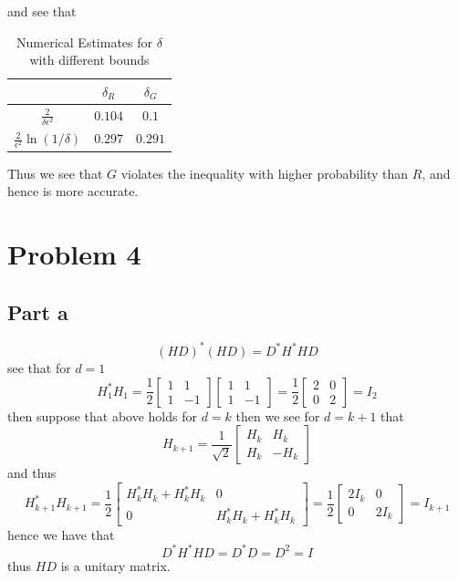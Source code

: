 \documentclass[12pt]{report}
\begin{document}
and see that

\begin{table}[H]
    \centering
    \begin{tabular}{c|c|c}
         & $\delta_R$  & $\delta_G$  \\ 
        \hline $\frac{2}{\delta \epsilon^2}$ &$0.104$  & $0.1$\\ 
        \hline $\frac{2}{\epsilon^2} \ln(1/\delta)$& $0.297$  & $0.291$ \\
    \end{tabular}
    \caption{Numerical Estimates for $\delta$ with different bounds}
    \label{tab:my_label}
\end{table}
Thus we see that $G$ violates the inequality with higher probability than $R$, and hence is more accurate. 
\section*{Problem 4}
\subsection*{Part a}
\begin{equation*}
    (HD)^*(HD) = D^*H^*HD
\end{equation*}
see that for $d = 1$
\begin{equation*}
    H_1^*H_1 = \frac{1}{2} \begin{bmatrix}
        1 & 1 \\
        1 & -1
    \end{bmatrix}\begin{bmatrix}
        1 & 1 \\
        1 & -1
    \end{bmatrix} = \frac{1}{2}\begin{bmatrix}
        2 & 0 \\
        0 & 2
    \end{bmatrix} = I_2
\end{equation*}
then suppose that above holds for $d = k$ then we see for $d = k + 1$ that
\begin{equation*}
    H_{k+1} = \frac{1}{\sqrt{2}}\begin{bmatrix}
        H_k & H_k \\
        H_k & -H_k
    \end{bmatrix}
\end{equation*}
and thus
\begin{equation*}
    H_{k+1}^*H_{k+1} = \frac{1}{2}\begin{bmatrix}
        H_k^*H_k + H_k^*H_k & 0 \\
        0 & H_k^*H_k + H_k^*H_k
    \end{bmatrix} =\frac{1}{2} \begin{bmatrix}
        2I_k & 0 \\
        0 & 2I_k
    \end{bmatrix} = I_{k+1}
\end{equation*}
hence we have that
\begin{equation*}
     D^*H^*HD = D^*D = D^2 = I
\end{equation*}
thus $HD$ is a unitary matrix.
\end{document}
